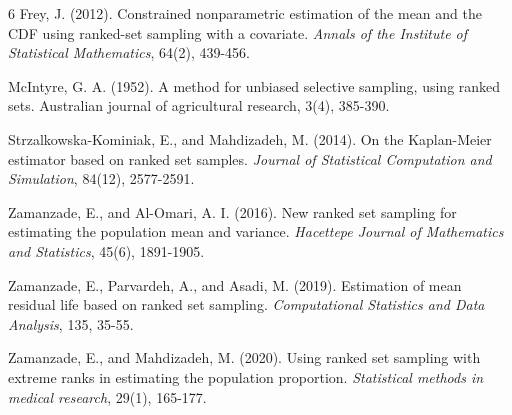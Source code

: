 \documentclass[twoside]{article}
\begin{document}
\begin{thebibliography}{6}
Frey, J. (2012). Constrained nonparametric estimation of the mean and the CDF using ranked-set sampling with a covariate. {\it Annals of the Institute of Statistical Mathematics}, 64(2), 439-456.

McIntyre, G. A. (1952). A method for unbiased selective sampling, using ranked sets. Australian journal of agricultural research, 3(4), 385-390.

Strzalkowska-Kominiak, E., and Mahdizadeh, M. (2014). On the Kaplan-Meier estimator based on ranked set samples. {\it Journal of Statistical Computation and Simulation}, 84(12), 2577-2591.

Zamanzade, E., and Al-Omari, A. I. (2016). New ranked set sampling for estimating the population mean and variance. {\it Hacettepe Journal of Mathematics and Statistics}, 45(6), 1891-1905.

Zamanzade, E., Parvardeh, A., and Asadi, M. (2019). Estimation of mean residual life based on ranked set sampling. {\it Computational Statistics and Data Analysis}, 135, 35-55.

Zamanzade, E., and Mahdizadeh, M. (2020). Using ranked set sampling with extreme ranks in estimating the population proportion. {\it Statistical methods in medical research}, 29(1), 165-177.


\end{thebibliography}
 
\end{document}
